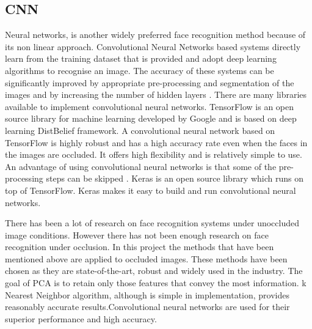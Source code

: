 \documentclass[conference]{IEEEtran}
\begin{document}
\subsection{CNN}
\label{subsec: 1d.CNN}
Neural networks, is another widely preferred face recognition method because of its non linear approach. Convolutional Neural Networks based systems directly learn from the training dataset that is provided and adopt deep learning algorithms to recognise an image. The accuracy of these systems can be significantly improved by appropriate pre-processing and segmentation of the images and by increasing the number of hidden layers \cite{dean2012large}.
There are many libraries available to implement convolutional neural networks\cite{2016arXiv160502688full}\cite{Jia:2014:CCA:2647868.2654889}\cite{tensorflow2015-whitepaper}. TensorFlow is an open source library for machine learning developed by Google and is based on deep learning DistBelief framework. A convolutional neural network based on TensorFlow is highly robust and has a high accuracy rate even when the faces in the images are occluded.  It offers high flexibility and is relatively simple to use\cite{tensorflow2015-whitepaper}. An advantage of using convolutional neural networks is that some of the pre-processing steps can be skipped \cite{oliveira2017irish}. Keras is an open source library which runs on top of TensorFlow. Keras makes it easy to build and run convolutional neural networks\cite{chollet2015keras}. 

There has been a lot of research on face recognition systems under unoccluded image conditions. However there has not been enough research on face recognition under occlusion. In this project the methods that have been mentioned above are applied to occluded images. These methods have been chosen as they are state-of-the-art, robust and widely used in the industry. The goal of PCA is to retain only those features that convey the most information\cite{turk1991face}. k Nearest Neighbor algorithm, although is simple in implementation, provides reasonably accurate results\cite{zhang2007ml}.Convolutional neural networks are used for their superior performance and high accuracy\cite{lawrence1997face}.
\end{document}
